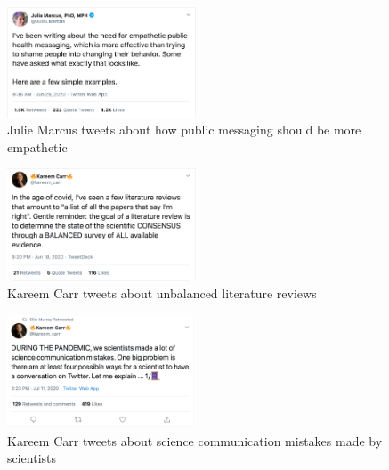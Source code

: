 \documentclass[acmsmall,authordraft]{acmart}
\begin{document}
\begin{figure}
  \includegraphics[width=0.5\textwidth]{Pictures/Appendix_Tweets/julie marcus tweet.png}
  \caption{Julie Marcus tweets about how public messaging should be more empathetic}
  \label{julie_marcus_tweet}
\end{figure}

\begin{figure}
  \includegraphics[width=0.5\textwidth]{Pictures/Appendix_Tweets/kareem carr tweet.png}
  \caption{Kareem Carr tweets about unbalanced literature reviews}
  \label{kareem_carr_tweet}
\end{figure}

\begin{figure}
  \includegraphics[width=0.5\textwidth]{Pictures/Appendix_Tweets/kareem carr tweet2.png}
  \caption{Kareem Carr tweets about science communication mistakes made by scientists}
  \label{kareem_carr_tweet2}
\end{figure}
\end{document}
